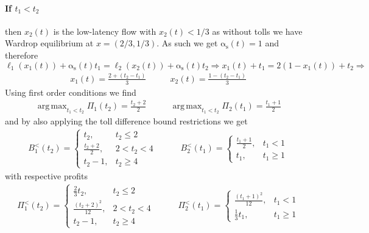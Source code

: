 \documentclass[10pt,a4paper]{book}
\newcommand{\as}{\mathrm{\alpha_s}}
\DeclareMathOperator*{\argmax}{arg\,max}
\theoremstyle{definition}
\theoremstyle{comment}
\begin{document}
\paragraph{If $t_1 < t_2$} then $x_2(t)$ is the low-latency flow with $x_2(t) < 1/3$ as without tolls we have Wardrop equilibrium at $x = (2/3, 1/3)$.
As such we get $\as(t) = 1$ and therefore
\[
	\ell_1(x_1(t)) + \as(t) t_1 = \ell_2(x_2(t)) + \as(t) t_2 \Rightarrow	x_1(t) + t_1 = 2 (1 - x_1(t)) + t_2 \Rightarrow
\]
\begin{equation*}
	\begin{aligned}
		x_1(t) = \frac{2 + (t_2 - t_1)}3
	\end{aligned}
	\qquad
	\begin{aligned}
		x_2(t) = \frac{1 - (t_2 - t_1)}3
	\end{aligned}
\end{equation*}
Using first order conditions we find
\begin{equation*}
	\begin{aligned}
		\argmax_{t_1 < t_2}\Pi_1(t_2) = \frac{t_2 + 2}2
	\end{aligned}
	\qquad
	\begin{aligned}
		\argmax_{t_1 < t_2}\Pi_2(t_1) = \frac{t_1 + 1}2
	\end{aligned}
\end{equation*}
and by also applying the toll difference bound restrictions we get
\begin{equation*}
	\begin{aligned}
		B_1^<(t_2) =
		\begin{cases}
			t_2, & t_2 \le 2 \\
			\frac{t_2 + 2}2, & 2 < t_2 < 4 \\
			t_2 - 1, & t_2 \ge 4
		\end{cases}
	\end{aligned}
	\qquad
	\begin{aligned}
		B_2^<(t_1) =
		\begin{cases}
			\frac{t_1 + 1}2, & t_1 < 1 \\
			t_1, & t_1 \ge 1
		\end{cases}
	\end{aligned}
\end{equation*}
with respective profits
\begin{equation*}
	\begin{aligned}
		\Pi_1^<(t_2) =
		\begin{cases}
			\frac23 t_2, & t_2 \le 2 \\
			\frac{(t_2 + 2)^2}{12}, & 2 < t_2 < 4 \\
			t_2 - 1, & t_2 \ge 4
		\end{cases}
	\end{aligned}
	\qquad
	\begin{aligned}
		\Pi_2^<(t_1) =
		\begin{cases}
			\frac{(t_1 + 1)^2}{12}, & t_1 < 1 \\
			\frac13 t_1, & t_1 \ge 1
		\end{cases}
	\end{aligned}
\end{equation*}
\end{document}
